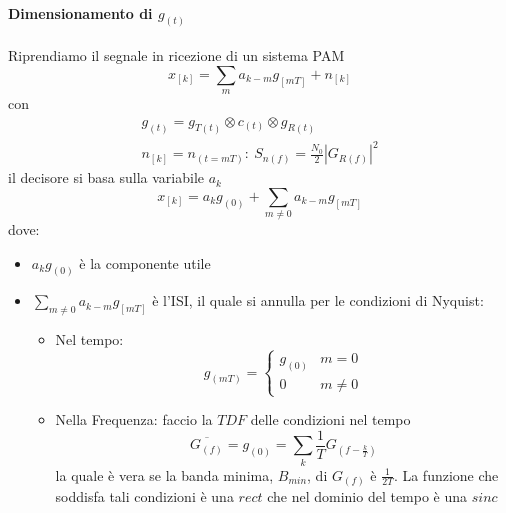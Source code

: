         \paragraph{Dimensionamento di $g_{(t)}$}
            Riprendiamo il segnale in ricezione di un sistema PAM
            \[
                x_{[k]} = \sum_{m} a_{k-m}g_{[mT]} + n_{[k]}   
            \]
            con 
            \begin{gather}
                g_{(t)} = g_{T(t)} \otimes c_{(t)} \otimes g_{R(t)}\nonumber \\
                n_{[k]} = n_{(t=mT)}:\ S_{n(f)} = \frac{N_0}{2} \left|G_{R(f)}\right|^2\nonumber
            \end{gather}
            il decisore si basa sulla variabile $a_k$
            \[
                x_{[k]} = a_{k}g_{(0)} + \sum_{m\neq 0} a_{k-m}g_{[mT]}    
            \]
            dove:
            \begin{itemize}
                \item {$a_{k}g_{(0)}$ è la componente utile}
                \item {$\sum_{m\neq 0} a_{k-m}g_{[mT]}$ è l'ISI, il quale si annulla per le condizioni di Nyquist:
                        \begin{itemize}
                            \item {Nel tempo:
                                \[
                                    g_{(mT)} = 
                                    \begin{cases}
                                        g_{(0)} &m=0\nonumber \\
                                        0 &m\neq 0\nonumber 
                                    \end{cases}  
                                \]
                            }
                            \item {Nella Frequenza: faccio la $TDF$ delle condizioni nel tempo
                                \[
                                    \overline{G_{(f)}} = g_{(0)} = \sum_{k}\frac{1}{T}G_{(f-\frac{k}{T})}    
                                \]
                                la quale è vera se la banda minima, $B_{min}$, di $G_{(f)}$ è $\frac{1}{2T}$. La 
                                funzione che soddisfa tali condizioni è una $rect$ che nel dominio del tempo è una $sinc$
                            }
                        \end{itemize}
                }
            \end{itemize}
